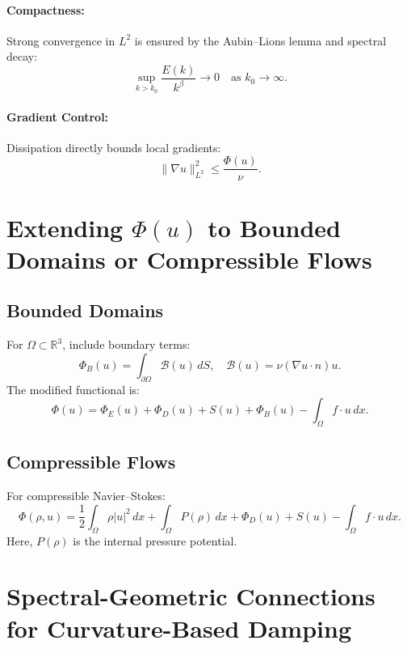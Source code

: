 \documentclass[12pt]{article}
\begin{document}
\paragraph{Compactness:} Strong convergence in \(L^2\) is ensured by the Aubin--Lions lemma and spectral decay:
\begin{equation}
\sup_{k > k_0} \frac{E(k)}{k^\beta} \to 0 \quad \text{as } k_0 \to \infty.
\end{equation}

\paragraph{Gradient Control:} Dissipation directly bounds local gradients:
\begin{equation}
\|\nabla u\|_{L^2}^2 \leq \frac{\Phi(u)}{\nu}.
\end{equation}

\section{Extending \(\Phi(u)\) to Bounded Domains or Compressible Flows}

\subsection{Bounded Domains}
For \(\Omega \subset \mathbb{R}^3\), include boundary terms:
\begin{equation}
\Phi_B(u) = \int_{\partial \Omega} \mathcal{B}(u) \, dS, \quad \mathcal{B}(u) = \nu (\nabla u \cdot n) u.
\end{equation}
The modified functional is:
\begin{equation}
\Phi(u) = \Phi_E(u) + \Phi_D(u) + S(u) + \Phi_B(u) - \int_\Omega f \cdot u \, dx.
\end{equation}

\subsection{Compressible Flows}
For compressible Navier--Stokes:
\begin{equation}
\Phi(\rho, u) = \frac{1}{2} \int_\Omega \rho |u|^2 \, dx + \int_\Omega P(\rho) \, dx + \Phi_D(u) + S(u) - \int_\Omega f \cdot u \, dx.
\end{equation}
Here, \(P(\rho)\) is the internal pressure potential.

\section{Spectral-Geometric Connections for Curvature-Based Damping}
\end{document}
